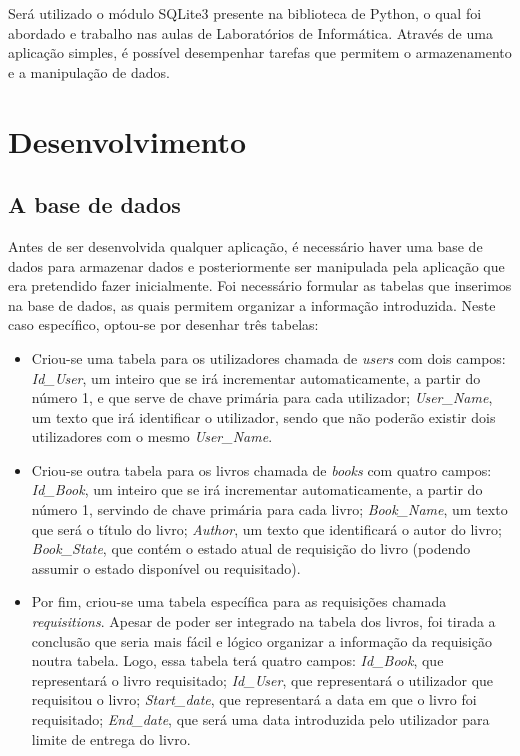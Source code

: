 \documentclass[11pt,openany,twoside]{report}
\begin{document}
Será utilizado o módulo SQLite3 presente na biblioteca de Python, o qual foi abordado e trabalho nas aulas de Laboratórios de Informática. Através de uma aplicação simples, é possível desempenhar tarefas que permitem o armazenamento e a manipulação de dados.

\part{Desenvolvimento}

\chapter{A base de dados}

Antes de ser desenvolvida qualquer aplicação, é necessário haver uma base de dados para armazenar dados e posteriormente ser manipulada pela aplicação que era pretendido fazer inicialmente. Foi necessário formular as tabelas que inserimos na base de dados, as quais permitem organizar a informação introduzida. Neste caso específico, optou-se por desenhar três tabelas:
\begin{itemize}
\item Criou-se uma tabela para os utilizadores chamada de \textit{users} com dois campos: \textit{Id\_User}, um inteiro que se irá incrementar automaticamente, a partir do número 1, e que serve de chave primária para cada utilizador; \textit{User\_Name}, um texto que irá identificar o utilizador, sendo que não poderão existir dois utilizadores com o mesmo \textit{User\_Name}.
\item Criou-se outra tabela para os livros chamada de \textit{books} com quatro campos: \textit{Id\_Book}, um inteiro que se irá incrementar automaticamente, a partir do número 1, servindo de chave primária para cada livro; \textit{Book\_Name}, um texto que será o título do livro; \textit{Author}, um texto que identificará o autor do livro; \textit{Book\_State}, que contém o estado atual de requisição do livro (podendo assumir o estado disponível ou requisitado).
\item Por fim, criou-se uma tabela específica para as requisições chamada \textit{requisitions}. Apesar de poder ser integrado na tabela dos livros, foi tirada a conclusão que seria mais fácil e lógico organizar a informação da requisição noutra tabela. Logo, essa tabela terá quatro campos: \textit{Id\_Book}, que representará o livro requisitado; \textit{Id\_User}, que representará o utilizador que requisitou o livro; \textit{Start\_date}, que representará a data em que o livro foi requisitado; \textit{End\_date}, que será uma data introduzida pelo utilizador para limite de entrega do livro.
\end{itemize}
\end{document}
